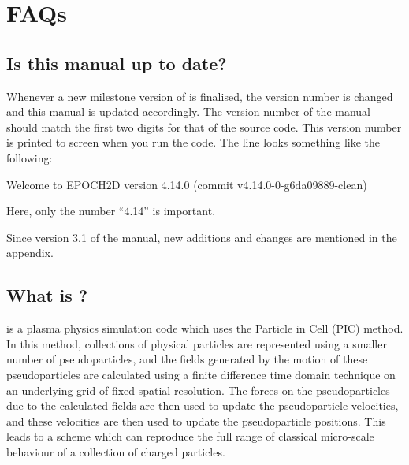 


%

{
  \selectfont
}
\selectfont%
\tableofcontents%
\newpage%
\DefineShortVerb{\#}

\section{FAQs}

\subsection{Is this manual up to date?}

Whenever a new milestone version of {\EPOCH} is finalised, the version
number is changed and this manual is updated accordingly. The version number
of the manual should match the first two digits for that of the {\EPOCH}
source code.
This version number is printed to screen when you run the code. The line looks
something like the following:
\begin{boxverbatim}
 Welcome to EPOCH2D version 4.14.0   (commit v4.14.0-0-g6da09889-clean)
\end{boxverbatim}
Here, only the number ``4.14'' is important.

Since version 3.1 of the manual, new additions and changes are mentioned
in the appendix.

\subsection{\texorpdfstring
  {What is {\EPOCH}?}
  {What is {EPOCH}?}}

{\EPOCH} is a plasma physics simulation code which uses the Particle in Cell
(PIC) method. In this method, collections of physical particles are represented
using a smaller number of pseudoparticles, and the fields generated by the
motion of these pseudoparticles are calculated using a finite difference time
domain technique on an underlying grid of fixed spatial resolution. The forces
on the pseudoparticles due to the calculated fields are then used to update the
pseudoparticle velocities, and these velocities are then used to update the
pseudoparticle positions. This leads to a scheme which can reproduce the full
range of classical micro-scale behaviour of a collection of charged
particles.

